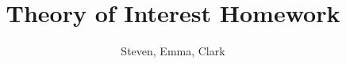 \documentclass[12pt]{article}
\newenvironment{theorem}[2][Theorem]{\begin{trivlist}
\item[\hskip \labelsep {\bfseries #1}\hskip \labelsep {\bfseries #2.}]}{\end{trivlist}}
\newenvironment{lemma}[2][Lemma]{\begin{trivlist}
\item[\hskip \labelsep {\bfseries #1}\hskip \labelsep {\bfseries #2.}]}{\end{trivlist}}
\newenvironment{exercise}[2][Exercise]{\begin{trivlist}
\item[\hskip \labelsep {\bfseries #1}\hskip \labelsep {\bfseries #2.}]}{\end{trivlist}}
\newenvironment{problem}[2][Problem]{\begin{trivlist}
\item[\hskip \labelsep {\bfseries #1}\hskip \labelsep {\bfseries #2.}]}{\end{trivlist}}
\newenvironment{question}[2][Question]{\begin{trivlist}
\item[\hskip \labelsep {\bfseries #1}\hskip \labelsep {\bfseries #2.}]}{\end{trivlist}}
\newenvironment{corollary}[2][Corollary]{\begin{trivlist}
\item[\hskip \labelsep {\bfseries #1}\hskip \labelsep {\bfseries #2.}]}{\end{trivlist}}
\begin{document}
 
 
\title{Theory of Interest Homework}%
\author{Steven, Emma, Clark\\ %
}%
\maketitle
\end{document}
